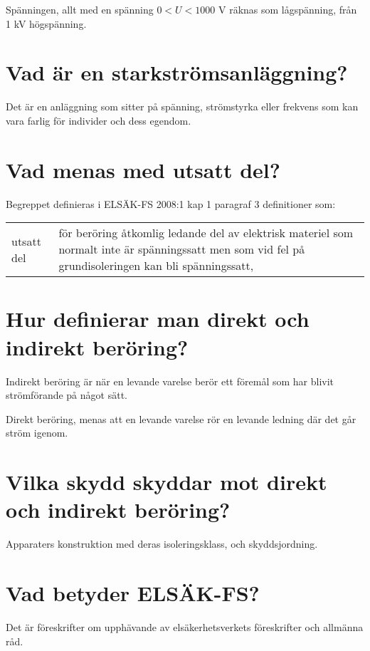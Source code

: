 \documentclass[a4paper,swedish]{article}
\begin{document}
Spänningen, allt med en spänning $0 < U <1000$ V räknas som lågspänning, från 1 kV högspänning.

\section{Vad är en starkströmsanläggning?}
\label{sec:q_59}

Det är en anläggning som sitter på spänning, strömstyrka eller frekvens som kan vara farlig för individer och dess egendom.

\section{Vad menas med utsatt del?}\label{sec:q_60}

Begreppet definieras i ELSÄK-FS 2008:1 kap 1 paragraf 3 definitioner som:

\begin{center}
  \begin{tabular}{|l p{10cm}|}
    utsatt del & för beröring åtkomlig ledande del av elektrisk materiel
                 som normalt inte är spänningssatt men som vid fel på
                 grundisoleringen kan bli spänningssatt,
  \end{tabular}
\end{center}

\section{Hur definierar man direkt och indirekt beröring?}
\label{sec:q_61}

Indirekt beröring är när en levande varelse berör ett föremål som har blivit strömförande på något sätt.

Direkt beröring, menas att en levande varelse rör en levande ledning där det går ström igenom.

\section{Vilka skydd skyddar mot direkt och indirekt beröring?}

Apparaters konstruktion med deras isoleringsklass, och skyddsjordning.

\section{Vad betyder ELSÄK-FS?}\label{sec:q_63}

Det är föreskrifter om upphävande av elsäkerhetsverkets föreskrifter och allmänna råd.
\end{document}

